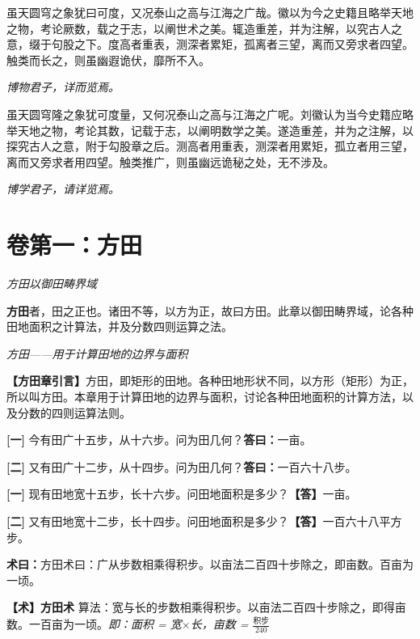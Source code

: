 \documentclass[10pt,a4paper]{article}
\newlength{\lw}
\newlength{\rw}
\newcommand{\biling}[2]{%
  \par\vspace{0.2em}%
  \noindent%
  \colorbox{classicalbg}{\parbox{\dimexpr\lw-2\fboxsep\relax}{#1}}%
  \hfill%
  \colorbox{modernbg}{\parbox{\dimexpr\rw-2\fboxsep\relax}{#2}}%
  \vspace{0.2em}%
}
\newcommand{\bilingc}[2]{%
  \par\vspace{0.1em}%
  \noindent\begin{minipage}[t]{\lw}
  {\small #1}
  \end{minipage}%
  \hfill%
  \begin{minipage}[t]{\rw}
  {\small #2}
  \end{minipage}%
  \vspace{0.1em}%
}
\newcommand{\da}{\textbf{\textcolor{answercolor}{答曰：}}}
\newcommand{\daB}{\textbf{\textcolor{answercolor}{【答】}}}
\newcommand{\shu}{\textbf{\textcolor{methodcolor}{术曰：}}}
\newcommand{\shuB}{\textbf{\textcolor{methodcolor}{【术】}}}
\newcommand{\pn}[1]{\textbf{[#1]}}
\newcommand{\sk}{\vspace{0.1em}}
\begin{document}
\sk

\biling{
虽天圆穹之象犹曰可度，又况泰山之高与江海之广哉。徽以为今之史籍且略举天地之物，考论厥数，载之于志，以阐世术之美。辄造重差，并为注解，以究古人之意，缀于句股之下。度高者重表，测深者累矩，孤离者三望，离而又旁求者四望。触类而长之，则虽幽遐诡伏，靡所不入。

\hfill\textit{博物君子，详而览焉。}
}{
虽天圆穹隆之象犹可度量，又何况泰山之高与江海之广呢。刘徽认为当今史籍应略举天地之物，考论其数，记载于志，以阐明数学之美。遂造重差，并为之注解，以探究古人之意，附于勾股章之后。测高者用重表，测深者用累矩，孤立者用三望，离而又旁求者用四望。触类推广，则虽幽远诡秘之处，无不涉及。

\hfill\textit{博学君子，请详览焉。}
}

\newpage


\section{卷第一：方田}
\label{sec:fangtian}

\biling{
\begin{center}\textit{方田以御田畴界域}\end{center}

\textbf{方田}者，田之正也。诸田不等，以方为正，故曰方田。此章以御田畴界域，论各种田地面积之计算法，并及分数四则运算之法。
}{
\begin{center}\textit{方田——用于计算田地的边界与面积}\end{center}

\textbf{【方田章引言】}方田，即矩形的田地。各种田地形状不同，以方形（矩形）为正，所以叫方田。本章用于计算田地的边界与面积，讨论各种田地面积的计算方法，以及分数的四则运算法则。
}

\bigskip

\bilingc{
\pn{一} 今有田广十五步，从十六步。问为田几何？\quad\da 一亩。

\pn{二} 又有田广十二步，从十四步。问为田几何？\quad\da 一百六十八步。
}{
\pn{一} 现有田地宽十五步，长十六步。问田地面积是多少？\quad\daB 一亩。

\pn{二} 又有田地宽十二步，长十四步。问田地面积是多少？\quad\daB 一百六十八平方步。
}

\sk

\bilingc{
\shu 方田术曰：广从步数相乘得积步。以亩法二百四十步除之，即亩数。百亩为一顷。
}{
\shuB \textbf{方田术} 算法：宽与长的步数相乘得积步。以亩法二百四十步除之，即得亩数。一百亩为一顷。\textit{即：面积 = 宽$\times$长，亩数 = $\frac{\text{积步}}{240}$}
}
\end{document}
